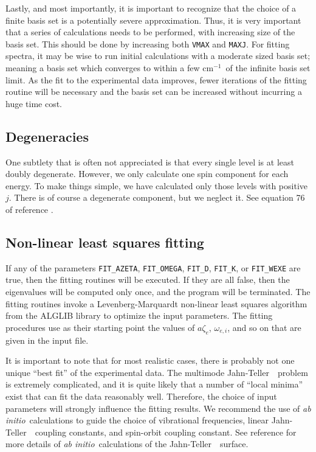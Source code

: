 \documentclass{article}
\newcommand{\wn}{cm$^{-1}$}
\newcommand{\ai}{{\it ab initio}}
\newcommand{\JT}{Jahn-Teller\ }
\begin{document}
Lastly, and most importantly, it is important to recognize that the
choice of a finite basis set is a potentially severe
approximation. Thus, it is very important that a series of
calculations needs to be performed, with increasing size of the basis
set. This should be done by increasing both {\tt VMAX} and {\tt MAXJ}. For fitting spectra, it may be wise to run initial calculations with a moderate sized basis set; meaning a basis set which converges to within a few \wn\ of the infinite basis set limit. As the fit to the experimental data improves, fewer iterations of the fitting routine will be necessary and the basis set can be increased without incurring a huge time cost.

\subsection{Degeneracies}
One subtlety that is often not appreciated is that every single level
is at least doubly degenerate. However, we only calculate one spin
component for each energy. To make things simple, we have calculated
only those levels with positive $j$. There is of course a degenerate
component, but we neglect it. See equation 76 of reference .

\subsection{Non-linear least squares fitting} \label{section:fitting}

If any of the parameters {\tt FIT\_AZETA}, {\tt FIT\_OMEGA}, {\tt FIT\_D}, {\tt FIT\_K},
or {\tt FIT\_WEXE} are true, then the fitting routines will be executed. If
they are all false, then the eigenvalues will be computed only once,
and the program will be terminated. The fitting routines invoke a Levenberg-Marquardt
non-linear least squares algorithm from the ALGLIB library\cite{alglib} to optimize the input parameters. The fitting
procedures use as their starting point the values of $a\zeta _e$,
$\omega _{e,i}$, and so on that are given in the input file.

It is important to note that for most realistic cases, there is
probably not one unique ``best fit'' of the experimental data. The
multimode \JT\ problem is extremely complicated, and it is quite
likely that a number of ``local minima'' exist that can fit the data
reasonably well. Therefore, the choice of input parameters will
strongly influence the fitting results. We recommend the use of \ai\
calculations to guide the choice of vibrational frequencies, linear
\JT\ coupling constants, and spin-orbit coupling constant. See
reference  for more details of \ai\ calculations of the
\JT\ surface.
\end{document}

